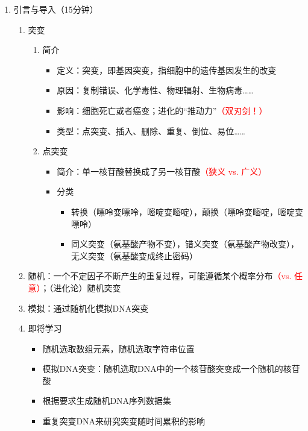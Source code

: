 \documentclass{TIJMUjiaoanLL}
\begin{document}
\firstTail

\newpage
\otherHeader

\begin{enumerate}
  \item 引言与导入（15分钟）
    \begin{enumerate}
      \item 突变
	\begin{enumerate}
	  \item 简介
	    \begin{itemize}
	      \item 定义：突变，即基因突变，指细胞中的遗传基因发生的改变
	      \item 原因：复制错误、化学毒性、物理辐射、生物病毒……
	      \item 影响：细胞死亡或者癌变；进化的“推动力”\textcolor{red}{（双刃剑！）}
	      \item 类型：点突变、插入、删除、重复、倒位、易位……
	    \end{itemize}
	  \item 点突变
	    \begin{itemize}
	      \item 简介：单一核苷酸替换成了另一核苷酸\textcolor{red}{（狭义 vs. 广义）}
	      \item 分类
		\begin{itemize}
		  \item 转换（嘌呤变嘌呤，嘧啶变嘧啶），颠换（嘌呤变嘧啶，嘧啶变嘌呤）
		  \item 同义突变（氨基酸产物不变），错义突变（氨基酸产物改变），无义突变（氨基酸变成终止密码）
		\end{itemize}
	    \end{itemize}
	\end{enumerate}
      \item 随机：一个不定因子不断产生的重复过程，可能遵循某个概率分布\textcolor{red}{（vs. 任意）}；（进化论）随机突变
      \item 模拟：通过随机化模拟DNA突变
      \item 即将学习
	\begin{itemize}
	  \item 随机选取数组元素，随机选取字符串位置
	  \item 模拟DNA突变：随机选取DNA中的一个核苷酸突变成一个随机的核苷酸
	  \item 根据要求生成随机DNA序列数据集
	  \item 重复突变DNA来研究突变随时间累积的影响
	\end{itemize}

\end{enumerate}
\end{enumerate}
\end{document}
